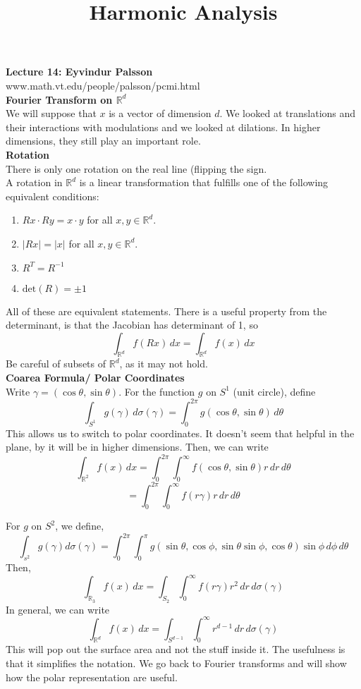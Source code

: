 \documentclass[12pt]{article}
\title{Harmonic Analysis}
\begin{document}
\noindent \textbf{Lecture 14: Eyvindur Palsson} \\
\noindent www.math.vt.edu/people/palsson/pcmi.html \\

\noindent \textbf{Fourier Transform on $\mathbb{R}^d$} \\
\noindent We will suppose that $x$ is a vector of dimension $d$. We looked at translations and their interactions with modulations and we looked at dilations. In higher dimensions, they still play an important role. \\

\noindent \textbf{Rotation} \\
\noindent There is only one rotation on the real line (flipping the sign. \\

\noindent A rotation in $\mathbb{R}^d$ is a linear transformation that fulfills one of the following equivalent conditions:

\begin{enumerate}[itemsep=0pt, parsep=0pt, partopsep=0pt, topsep=0pt]
\item $Rx \cdot Ry = x \cdot y$ for all $x,y \in \mathbb{R}^d$.
\item $\vert R x\vert = \vert x \vert$ for all $x,y \in \mathbb{R}^d$.
\item $R^T = R^{-1}$
\item $\text{det}(R) = \pm 1$
\end{enumerate}
\noindent All of these are equivalent statements. There is a useful property from the determinant, is that the Jacobian has determinant of 1, so  
$$\int_{\mathbb{R}^d} f(Rx) \, dx = \int_{\mathbb{R}^d} f(x) \,dx$$
Be careful of subsets of $\mathbb{R}^d$, as it may not hold. \\

\noindent \textbf{Coarea Formula/ Polar Coordinates} \\
\noindent Write $\gamma = (\cos \theta, \sin \theta)$. For the function $g$ on $S^1$ (unit circle), define
$$\int_{S^1} g(\gamma) \,d\sigma(\gamma) = \int^{2\pi}_0 g(\cos \theta, \sin \theta) \, d\theta$$
This allows us to switch to polar coordinates. It doesn't seem that helpful in the plane, by it will be in higher dimensions. Then, we can write
$$\int_{\mathbb{R}^2} f(x) \,dx = \int^{2\pi}_0 \int_0^\infty f(\cos \theta, \sin \theta) r \,dr \, d\theta$$
$$= \int^{2\pi}_0 \int_0^\infty f(r\gamma) r \,dr \, d\theta$$

\noindent For $g$ on $S^2$, we define,
$$\int_{s^2} g(\gamma) d\sigma(\gamma) = \int^{2\pi}_0 \int^\pi_0 g(\sin \theta, \cos \phi, \sin \theta \sin \phi, \cos \theta) \sin \phi \,d\phi \,d\theta$$
Then,
$$\int_{\mathbb{R}_3} f(x) \, dx = \int_{S_2} \int_0^\infty f(r\gamma) r^2 \, dr \,d\sigma(\gamma)$$
\noindent In general, we can write 
$$\int_{\mathbb{R}^d}f(x) \, dx = \int_{S^{d-1}} \int_0^\infty r^{d-1} \, dr \,d\sigma(\gamma)$$
\noindent This will pop out the surface area and not the stuff inside it. The usefulness is that it simplifies the notation. We go back to Fourier transforms and will show how the polar representation are useful. \\
\end{document}
